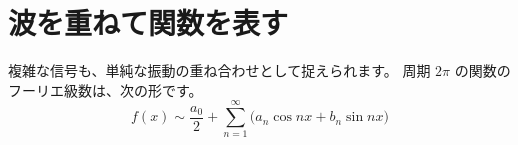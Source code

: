\section{波を重ねて関数を表す}\label{sec:waves}
複雑な信号も、単純な振動の重ね合わせとして捉えられます。
周期 $2\pi$ の関数のフーリエ級数は、次の形です。
\begin{equation}\label{eq:series}
  f(x) \sim \frac{a_0}{2} + \sum_{n=1}^{\infty} \bigl(a_n\cos nx + b_n\sin nx\bigr)
\end{equation}
